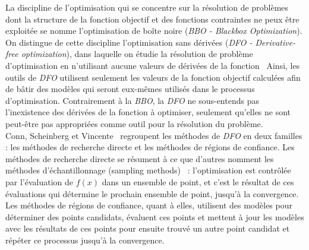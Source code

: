 La discipline de l'optimisation qui se concentre sur la résolution de problèmes dont la structure de la fonction objectif et des fonctions contraintes ne peux être exploitée se nomme l'optimisation de boîte noire (\textit{BBO - Blackbox Optimization}). On distingue de cette discipline l'optimisation sans dérivées (\textit{DFO -  Derivative-free optimization}), dans laquelle on étudie la résolution de problème d'optimisation en n'utilisant aucune valeurs de dérivées de la fonction~\cite{AuHa2018,AuKok2016} Ainsi, les outils de \textit{DFO} utilisent seulement les valeurs de la fonction objectif calculées afin de bâtir des modèles qui seront eux-mêmes utilisés dans le processus d'optimisation. Contrairement à la \textit{BBO}, la \textit{DFO}  ne sous-entends pas l'inexistence des dérivées de la fonction à optimiser, seulement qu'elles ne sont peut-être pas appropriées comme outil pour la résolution du problème.\\
Conn, Scheinberg et Vincente~\cite{CoScVibook} regroupent les méthodes de \textit{DFO}  en deux familles :  les méthodes de recherche directe et les méthodes de régions de confiance. Les méthodes de recherche directe se résument à ce que d'autres nomment les méthodes d'échantillonnage (sampling methods)~\cite{Kelley2011} : l'optimisation est contrôlée par l'évaluation de $f(x)$ dans un ensemble de point, et c'est le résultat de ces évaluations qui détermine le prochain ensemble de point, jusqu'à la convergence. Les méthodes de régions de confiance, quant à elles, utilisent des modèles pour déterminer des points candidats, évaluent ces points et mettent à jour les modèles avec les résultats de ces points pour ensuite trouvé un autre point candidat et répéter ce processus jusqu'à la convergence.
